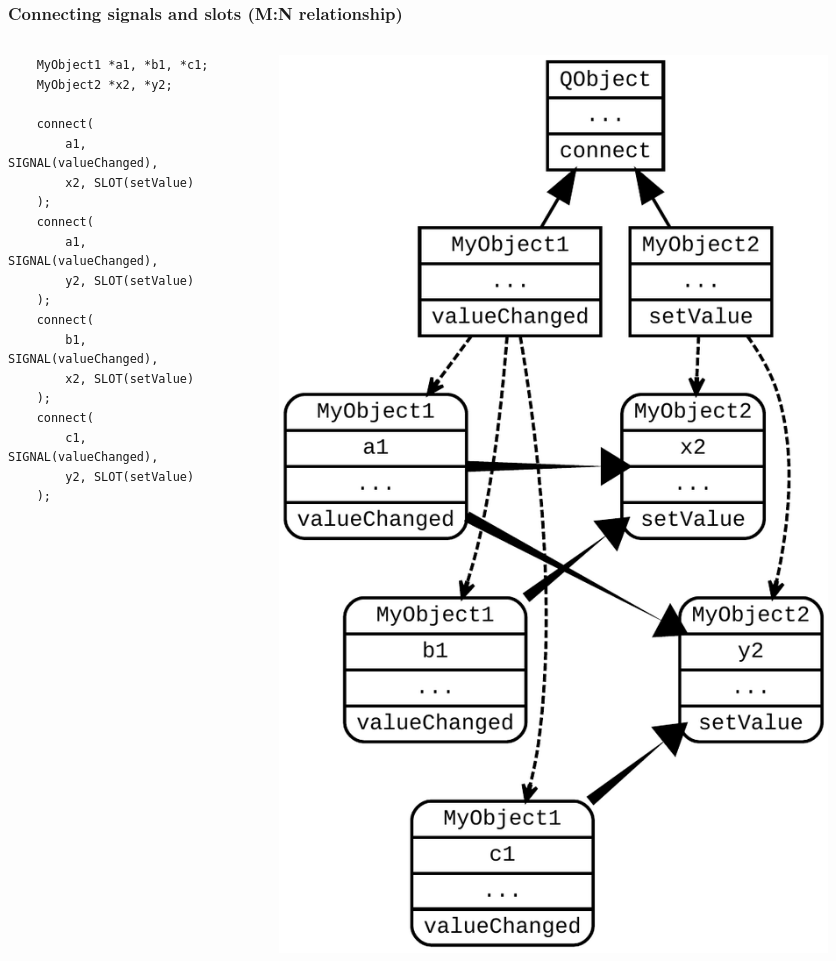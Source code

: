 \begin{frame}[fragile]
  \frametitle{Connecting signals and slots (M:N relationship)}
  \begin{columns}
    \begin{column}{0.64\textwidth}
    \begin{lstlisting}
	MyObject1 *a1, *b1, *c1;
	MyObject2 *x2, *y2;

	connect(
	    a1, SIGNAL(valueChanged),
	    x2, SLOT(setValue)
	);
	connect(
	    a1, SIGNAL(valueChanged),
	    y2, SLOT(setValue)
	);
	connect(
	    b1, SIGNAL(valueChanged),
	    x2, SLOT(setValue)
	);
	connect(
	    c1, SIGNAL(valueChanged),
	    y2, SLOT(setValue)
	);
    \end{lstlisting}
    \end{column}
    \begin{column}{0.36\textwidth}
      \begin{figure}[!t]
      \includegraphics[width=\textwidth]{images/sig_slot_schema.pdf}
      \end{figure}
    \end{column}
  \end{columns}
\end{frame}


